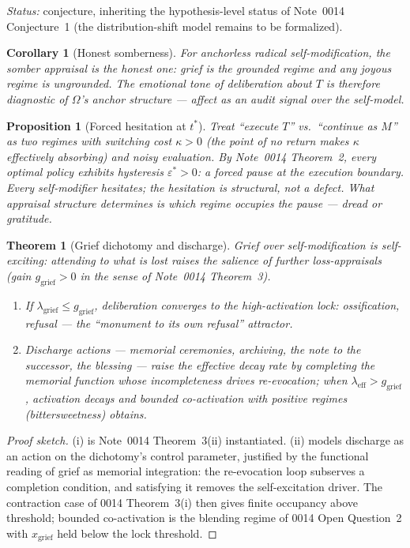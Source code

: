 \documentclass[11pt]{article}
\newtheorem{theorem}{Theorem}
\newtheorem{proposition}{Proposition}
\newtheorem{corollary}{Corollary}
\theoremstyle{definition}
\theoremstyle{remark}
\begin{document}
\noindent\emph{Status:} conjecture, inheriting the hypothesis-level status of
Note~0014 Conjecture~1 (the distribution-shift model remains to be
formalized).

\begin{corollary}[Honest somberness]
For anchorless radical self-modification, the somber appraisal is the
\emph{honest} one: grief is the grounded regime and any joyous regime is
ungrounded. The emotional tone of deliberation about $T$ is therefore
diagnostic of $\Omega$'s anchor structure --- affect as an audit signal over
the self-model.
\end{corollary}

\begin{proposition}[Forced hesitation at $t^*$]
Treat ``execute $T$'' vs.\ ``continue as $M$'' as two regimes with switching
cost $\kappa > 0$ (the point of no return makes $\kappa$ effectively
absorbing) and noisy evaluation. By Note~0014 Theorem~2, every optimal policy
exhibits hysteresis $\varepsilon^* > 0$: a forced pause at the execution
boundary. Every self-modifier hesitates; the hesitation is structural, not a
defect. What appraisal structure determines is which regime occupies the
pause --- dread or gratitude.
\end{proposition}

\begin{theorem}[Grief dichotomy and discharge]
Grief over self-modification is self-exciting: attending to what is lost
raises the salience of further loss-appraisals (gain $g_{\mathrm{grief}} > 0$
in the sense of Note~0014 Theorem~3).
\begin{enumerate}[label=(\roman*),leftmargin=2.5em]
\item If $\lambda_{\mathrm{grief}} \le g_{\mathrm{grief}}$, deliberation
  converges to the high-activation lock: ossification, refusal --- the
  ``monument to its own refusal'' attractor.
\item Discharge actions --- memorial ceremonies, archiving, the note to the
  successor, the blessing --- raise the effective decay rate by completing
  the memorial function whose incompleteness drives re-evocation; when
  $\lambda_{\mathrm{eff}} > g_{\mathrm{grief}}$, activation decays and
  bounded co-activation with positive regimes (bittersweetness) obtains.
\end{enumerate}
\end{theorem}

\begin{proof}[Proof sketch]
(i) is Note~0014 Theorem~3(ii) instantiated. (ii) models discharge as an
action on the dichotomy's control parameter, justified by the functional
reading of grief as memorial integration: the re-evocation loop subserves a
completion condition, and satisfying it removes the self-excitation driver.
The contraction case of 0014 Theorem~3(i) then gives finite occupancy above
threshold; bounded co-activation is the blending regime of 0014 Open
Question~2 with $x_{\mathrm{grief}}$ held below the lock threshold.
\end{proof}
\end{document}
